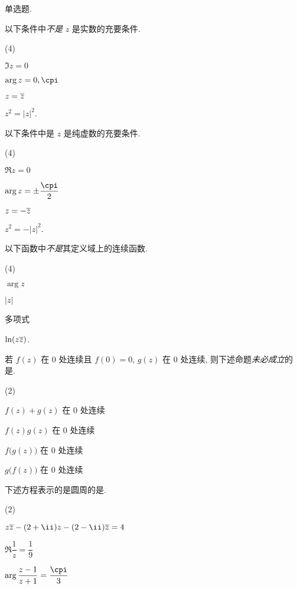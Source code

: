 \begin{homework}
  \item 单选题.
  \begin{homework}
    \item 以下条件中\fillbrace{}\emph{不是} $z$ 是实数的充要条件.
    \begin{exchoice}(4)
      \item $\Im z=0$
      \item $\arg z=0,\cpi$
      \item $z=\overline z$
      \item $z^2=|z|^2$.
    \end{exchoice}
    \item 以下条件中\fillbrace{}是 $z$ 是纯虚数的充要条件.
    \begin{exchoice}(4)
      \item $\Re z=0$
      \item $\arg z=\pm\dfrac\cpi2$
      \item $z=-\overline z$
      \item $z^2=-|z|^2$.
    \end{exchoice}
    \item 以下函数中\fillbrace{}\emph{不是}其定义域上的连续函数.
    \begin{exchoice}(4)
      \item $\arg z$
      \item $|z|$
      \item 多项式
      \item $\ln(z\overline z)$.
    \end{exchoice}
    \item 若 $f(z)$ 在 $0$ 处连续且 $f(0)=0$, $g(z)$ 在 $0$ 处连续, 则下述命题\emph{未必成立}的是\fillbrace{}.
    \begin{exchoice}(2)
      \item $f(z)+g(z)$ 在 $0$ 处连续
      \item $f(z)g(z)$ 在 $0$ 处连续
      \item $f\bigl(g(z)\bigr)$ 在 $0$ 处连续
      \item $g\bigl(f(z)\bigr)$ 在 $0$ 处连续
    \end{exchoice}
    \item 下述方程表示的是圆周的是\fillbrace{}.
    \begin{exchoice}(2)
      \item $z\ov z-(2+\ii)z-(2-\ii)\ov z=4$
      \item $\Re\dfrac{1}{z}=\dfrac{1}{9}$
      \item $\arg\dfrac{z-1}{z+1}=\dfrac{\cpi}{3}$

\end{exchoice}
\end{homework}
\end{homework}
